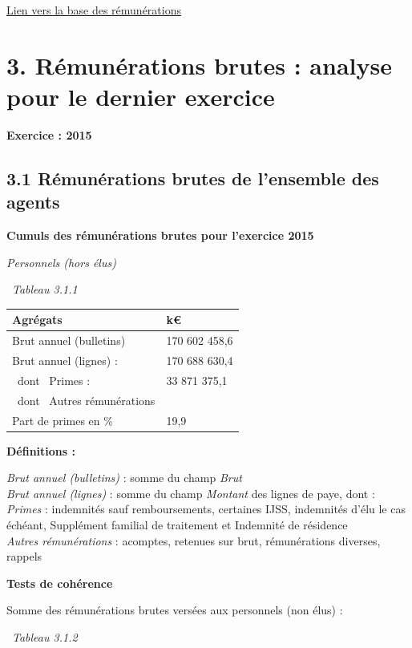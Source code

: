 \href{../Bases/Remunerations/Analyse.remunerations.csv}{Lien vers la base
des rémunérations}

\newpage

\hypertarget{remunerations-brutes-analyse-pour-le-dernier-exercice}{%
\section{3. Rémunérations brutes : analyse pour le dernier
exercice}\label{remunerations-brutes-analyse-pour-le-dernier-exercice}}

\textbf{Exercice : 2015 }

\hypertarget{remunerations-brutes-de-lensemble-des-agents-1}{%
\subsection{3.1 Rémunérations brutes de l'ensemble des
agents}\label{remunerations-brutes-de-lensemble-des-agents-1}}

\textbf{Cumuls des rémunérations brutes pour l'exercice 2015 }

\emph{Personnels (hors élus)}

~\emph{Tableau 3.1.1}

\begin{longtable}[]{@{}ll@{}}
\toprule
Agrégats & k€\tabularnewline
\midrule
\endhead
Brut annuel (bulletins) & 170 602 458,6\tabularnewline
Brut annuel (lignes) : & 170 688 630,4\tabularnewline
~dont ~Primes : & 33 871 375,1\tabularnewline
~dont ~Autres rémunérations &\tabularnewline
Part de primes en \% & 19,9\tabularnewline
\bottomrule
\end{longtable}

\textbf{Définitions :}

\emph{Brut annuel (bulletins)} : somme du champ \emph{Brut}\\
\emph{Brut annuel (lignes)} : somme du champ \emph{Montant} des lignes
de paye, dont :\\
\emph{Primes} : indemnités sauf remboursements, certaines IJSS,
indemnités d'élu le cas échéant, Supplément familial de traitement et
Indemnité de résidence\\
\emph{Autres rémunérations} : acomptes, retenues sur brut, rémunérations
diverses, rappels

\textbf{Tests de cohérence}

Somme des rémunérations brutes versées aux personnels (non élus) :

~\emph{Tableau 3.1.2}

